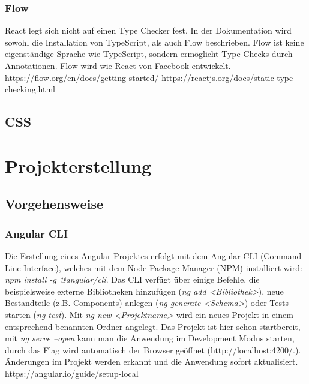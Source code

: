 \subsubsection{Flow}

React legt sich nicht auf einen Type Checker fest. In der Dokumentation wird sowohl die Installation von TypeScript, als auch Flow beschrieben. Flow ist keine eigenständige Sprache wie TypeScript, sondern ermöglicht Type Checks durch Annotationen. Flow wird wie React von Facebook entwickelt.
https://flow.org/en/docs/getting-started/
https://reactjs.org/docs/static-type-checking.html

\subsection{CSS}

\section{Projekterstellung}
\subsection{Vorgehensweise}
\subsubsection{Angular CLI}
Die Erstellung eines Angular Projektes erfolgt mit dem Angular CLI (Command Line Interface), welches mit dem Node Package Manager (NPM) installiert wird: \textit{npm install -g @angular/cli}. Das CLI verfügt über einige Befehle, die beispielsweise externe Bibliotheken hinzufügen (\textit{ng add <Bibliothek>}), neue Bestandteile (z.B. Components) anlegen (\textit{ng generate <Schema>}) oder Tests starten (\textit{ng test}). Mit \textit{ng new <Projektname>} wird ein neues Projekt in einem entsprechend benannten Ordner angelegt. Das Projekt ist hier schon startbereit, mit \textit{ng serve --open} kann man die Anwendung im Development Modus starten, durch das Flag wird automatisch der Browser geöffnet (http://localhost:4200/.). Änderungen im Projekt werden erkannt und die Anwendung sofort aktualisiert.
https://angular.io/guide/setup-local

